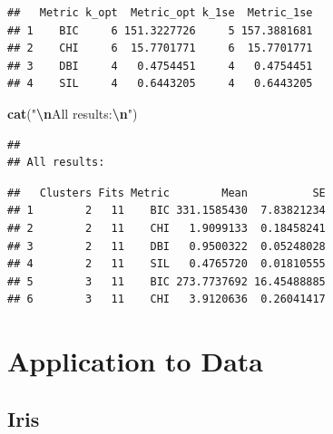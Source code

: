 \documentclass[12pt]{article}
\newenvironment{Shaded}{\begin{snugshade}}{\end{snugshade}}
\newcommand{\FunctionTok}[1]{\textcolor[rgb]{0.13,0.29,0.53}{\textbf{#1}}}
\newcommand{\NormalTok}[1]{#1}
\newcommand{\SpecialCharTok}[1]{\textcolor[rgb]{0.81,0.36,0.00}{\textbf{#1}}}
\newcommand{\StringTok}[1]{\textcolor[rgb]{0.31,0.60,0.02}{#1}}
\begin{document}
\begin{Shaded}
\end{Shaded}

\begin{verbatim}
##   Metric k_opt  Metric_opt k_1se  Metric_1se
## 1    BIC     6 151.3227726     5 157.3881681
## 2    CHI     6  15.7701771     6  15.7701771
## 3    DBI     4   0.4754451     4   0.4754451
## 4    SIL     4   0.6443205     4   0.6443205
\end{verbatim}

\begin{Shaded}
\begin{Highlighting}[]
\FunctionTok{cat}\NormalTok{(}\StringTok{"}\SpecialCharTok{\textbackslash{}n}\StringTok{All results:}\SpecialCharTok{\textbackslash{}n}\StringTok{"}\NormalTok{)}
\end{Highlighting}
\end{Shaded}

\begin{verbatim}
## 
## All results:
\end{verbatim}

\begin{Shaded}
\end{Shaded}

\begin{verbatim}
##   Clusters Fits Metric        Mean          SE
## 1        2   11    BIC 331.1585430  7.83821234
## 2        2   11    CHI   1.9099133  0.18458241
## 3        2   11    DBI   0.9500322  0.05248028
## 4        2   11    SIL   0.4765720  0.01810555
## 5        3   11    BIC 273.7737692 16.45488885
## 6        3   11    CHI   3.9120636  0.26041417
\end{verbatim}

\hypertarget{application-to-data}{%
\section{Application to Data}\label{application-to-data}}

\hypertarget{iris}{%
\subsection{Iris}\label{iris}}
\end{document}
